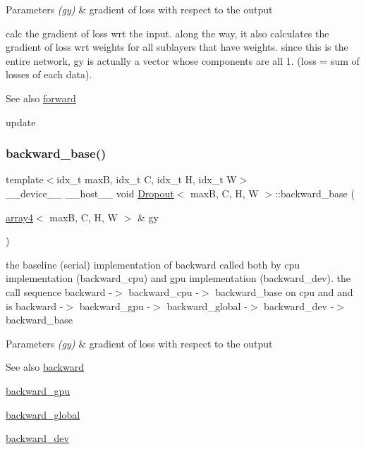 \begin{DoxyParams}{Parameters}
{\em (gy)} & gradient of loss with respect to the output\\
\hline
\end{DoxyParams}
calc the gradient of loss wrt the input. along the way, it also calculates the gradient of loss wrt weights for all sublayers that have weights. since this is the entire network, gy is actually a vector whose components are all 1. (loss = sum of losses of each data). \begin{DoxySeeAlso}{See also}
\hyperlink{structDropout_a155eb3ad77df591bdd95645fec1f2089}{forward} 

update 
\end{DoxySeeAlso}
\mbox{\label{structDropout_a8ea26e89ddc6b5e4546f5a6ed019ad9a}} 
\subsubsection{\texorpdfstring{backward\+\_\+base()}{backward\_base()}}
{\footnotesize\ttfamily template$<$idx\+\_\+t maxB, idx\+\_\+t C, idx\+\_\+t H, idx\+\_\+t W$>$ \\
\+\_\+\+\_\+device\+\_\+\+\_\+ \+\_\+\+\_\+host\+\_\+\+\_\+ void \hyperlink{structDropout}{Dropout}$<$ maxB, C, H, W $>$\+::backward\+\_\+base (\begin{DoxyParamCaption}\item[{\hyperlink{structarray4}{array4}$<$ maxB, C, H, W $>$ \&}]{gy }\end{DoxyParamCaption})\hspace{0.3cm}{\ttfamily [inline]}}



the baseline (serial) implementation of backward called both by cpu implementation (backward\+\_\+cpu) and gpu implementation (backward\+\_\+dev). the call sequence backward -\/$>$ backward\+\_\+cpu -\/$>$ backward\+\_\+base on cpu and and is backward -\/$>$ backward\+\_\+gpu -\/$>$ backward\+\_\+global -\/$>$ backward\+\_\+dev -\/$>$ backward\+\_\+base 


\begin{DoxyParams}{Parameters}
{\em (gy)} & gradient of loss with respect to the output \\
\hline
\end{DoxyParams}
\begin{DoxySeeAlso}{See also}
\hyperlink{structDropout_afe1afe7ce80e59d1b48c820a724aae1b}{backward} 

\hyperlink{structDropout_a138fbe07114851e478ac794629b6f44a}{backward\+\_\+gpu} 

\hyperlink{softmaxcrossentropy_8h_a47d56a9a23e08247b227f4aac17413e0}{backward\+\_\+global} 

\hyperlink{structDropout_a5bbc54ad4125bf6768b5eeb17802a468}{backward\+\_\+dev} 
\end{DoxySeeAlso}
\mbox{\label{structDropout_a6f78f35970607365a64e5f447bed4c04}} 
